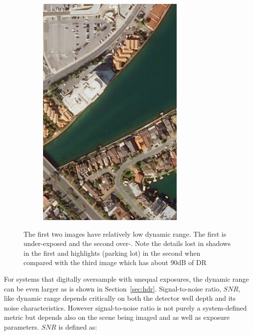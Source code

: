 \documentclass[10pt,journal]{IEEEtran}  %
\begin{document}
\begin{figure}[h!]
\begin{subfigure}{0.31\linewidth}
\includegraphics[width = \textwidth]{figures/pb_good_dr.png}
\end{subfigure}
\caption{The first two images have relatively low dynamic range.  The first is under-exposed and the second over-.  Note the details lost in shadows in the first and highlights (parking lot) in the second when compared with the third image which has about 90dB of DR}
\end{figure}

For systems that digitally oversample with unequal exposures, the dynamic range can be even larger as is shown in Section~\ref{sec:hdr}.
Signal-to-noise ratio, $SNR$, like dynamic range depends critically on both the detector well depth and its noise characteristics.  However signal-to-noise ratio is not purely a system-defined metric but depends also on the scene being imaged and as well as exposure parameters.  $SNR$ is defined as:
\end{document}
